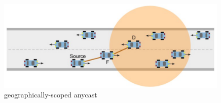 \begin{figure}
	\includegraphics[width=0.99\textwidth]{content/images/03_networklayer/GSA.png}
	\caption{geographically-scoped anycast \cite{etsi102636-1}}
	\label{fig:gsa}
\end{figure}

